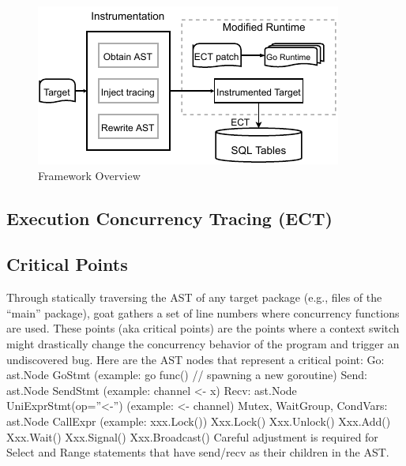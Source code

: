 \begin{figure}
\centering
  \includegraphics[width=.95\linewidth]{figs/overview.pdf}
  \caption{Framework Overview}
  \label{fig:overview}
\end{figure}


\subsection{Execution Concurrency Tracing (ECT)}
\label{sec:ect}



\subsection{Critical Points}
\label{sec:critical}

Through statically traversing the AST of any target package (e.g., files of the “main” package), goat gathers a set of line numbers where concurrency functions are used. These points (aka critical points) are the points where a context switch might drastically change the concurrency behavior of the program and trigger an undiscovered bug. Here are the AST nodes that represent a critical point:
Go: ast.Node GoStmt   (example: go func() // spawning a new goroutine)
Send: ast.Node SendStmt     (example: channel <- x)
Recv: ast.Node UniExprStmt(op=”<-”) (example:  <- channel)
Mutex, WaitGroup, CondVars: ast.Node CallExpr (example: xxx.Lock())
Xxx.Lock()
Xxx.Unlock()
Xxx.Add()
Xxx.Wait()
Xxx.Signal()
Xxx.Broadcast()
Careful adjustment is required for Select and Range statements that have send/recv as their children in the AST.

